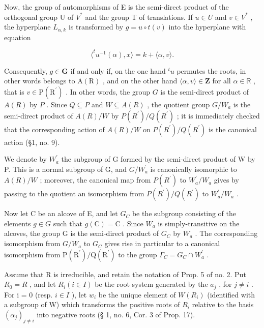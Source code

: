 Now, the group of automorphisms of E is the semi-direct product of the orthogonal group U of \(V^{*}\) and the group T of translations. If \(u \in U\) and \(v \in V^{*}\) , the hyperplane \(L_{\alpha,k}\) is transformed by \(g = u \circ t(v)\) into the hyperplane with equation

\[
\langle^ {t} u ^ {- 1} (\alpha), x \rangle = k + \langle \alpha , v \rangle .
\]

Consequently, \(g \in \mathbf{G}\) if and only if, on the one hand \({}^t u\) permutes the roots, in other words belongs to \(\mathrm{A(R)}\) , and on the other hand \(\langle \alpha, v \rangle \in \mathbf{Z}\) for all \(\alpha \in \mathbb{R}\) , that is \(v \in \mathrm{P(R^{\prime})}\) . In other words, the group \(G\) is the semi-direct product of \(A(R)\) by \(P\) . Since \(Q \subseteq P\) and \(W \subseteq A(R)\) , the quotient group \(G / W_a\) is the semi-direct product of \(A(R)/W\) by \(P(R^{\prime})/Q(R^{\prime})\) ; it is immediately checked that the corresponding action of \(A(R)/W\) on \(P(R^{\prime})/Q(R^{\prime})\) is the canonical action (§1, no. 9).

We denote by \(W_{a}^{\prime}\) the subgroup of G formed by the semi-direct product of W by P. This is a normal subgroup of G, and \(G/W_{a}^{\prime}\) is canonically isomorphic to \(A(R)/W\) ; moreover, the canonical map from \(P(R^{\prime})\) to \(W_{a}^{\prime}/W_{a}\) gives by passing to the quotient an isomorphism from \(P(R^{\prime})/Q(R^{\prime})\) to \(W_{a}^{\prime}/W_{a}\) .

Now let C be an alcove of E, and let \(G_{C}\) be the subgroup consisting of the elements \(g \in G\) such that \(g(\mathrm{C}) = \mathrm{C}\) . Since \(W_{a}\) is simply-transitive on the alcoves, the group G is the semi-direct product of \(G_{C}\) by \(W_{a}\) . The corresponding isomorphism from \(G/W_{a}\) to \(G_{C}\) gives rise in particular to a canonical isomorphism from \(\mathrm{P}(\mathrm{R}^{\prime})/\mathrm{Q}(\mathrm{R}^{\prime})\) to the group \(\Gamma_{C} = G_{C} \cap W_{a}^{\prime}\) .

Assume that R is irreducible, and retain the notation of Prop. 5 of no. 2. Put \(R_{0} = R\) , and let \(R_{i} (i \in I)\) be the root system generated by the \(a_{j}\) , for \(j \neq i\) . For i = 0 (resp. \(i \in I\) ), let \(w_{i}\) be the unique element of \(W(R_{i})\) (identified with a subgroup of W) which transforms the positive roots of \(R_{i}\) relative to the basis \((\alpha_{j})_{j \neq i}\) into negative roots (§ 1, no. 6, Cor. 3 of Prop. 17).

